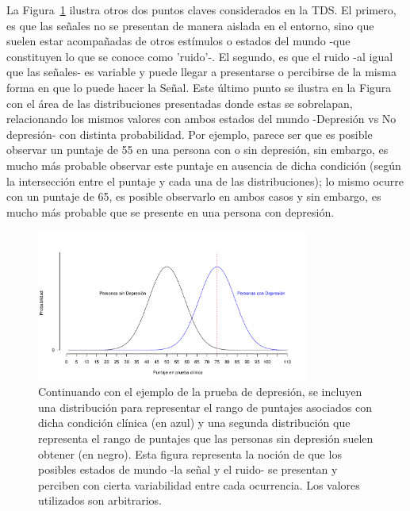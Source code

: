 \begin{itemize}
\begin{itemize}
La Figura~\ref{fig:Noise} ilustra otros dos puntos claves considerados en la TDS. El primero, es que las señales no se presentan de manera aislada en el entorno, sino que suelen estar acompañadas de otros estímulos o estados del mundo -que constituyen lo que se conoce como 'ruido'-. El segundo, es que el ruido -al igual que las señales- es variable y puede llegar a presentarse o percibirse de la misma forma en que lo puede hacer la Señal. Este último punto se ilustra en la Figura con el área de las distribuciones presentadas donde estas se sobrelapan, relacionando los mismos valores con ambos estados del mundo -Depresión vs No depresión- con distinta probabilidad. Por ejemplo, parece ser que es posible observar un puntaje de 55 en una persona con o sin depresión, sin embargo, es mucho más probable observar este puntaje en ausencia de dicha condición (según la intersección entre el puntaje y cada una de las distribuciones); lo mismo ocurre con un puntaje de 65, es posible observarlo en ambos casos y sin embargo, es mucho más probable que se presente en una persona con depresión.\\

\begin{figure}[th]
\centering
\includegraphics[width=0.80\textwidth]{Figures/Noise} 
\caption[Variabilidad en la señal y en el ruido]{Continuando con el ejemplo de la prueba de depresión, se incluyen una distribución para representar el rango de puntajes asociados con dicha condición clínica (en azul) y una segunda distribución que representa el rango de puntajes que las personas sin depresión suelen obtener (en negro). Esta figura representa la noción de que los posibles estados de mundo -la señal y el ruido- se presentan y perciben con cierta variabilidad entre cada ocurrencia. Los valores utilizados son arbitrarios.}
\label{fig:Noise}
\end{figure}


\end{itemize}
\end{itemize}
